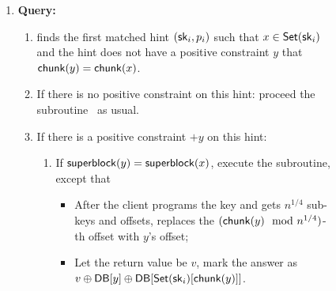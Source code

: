 \begin{figure}[p]
\begin{minipage}{\textwidth}
\begin{mdframed}
\begin{itemize}[leftmargin=3mm,itemsep=1pt]
                             
            \end{itemize}
            
            
            
            
            \begin{enumerate}[leftmargin=5mm,itemsep=1pt]
                \item 
                {\bf Query:}
                \begin{enumerate}[leftmargin=5mm,itemsep=1pt]
                    \item 
                    \Client finds {the first} matched hint $(\mathsf{sk}_i, p_i)$
                    such that $x\in \mathsf{Set}(\mathsf{sk}_i)$ and the hint does not have a
                    positive constraint $y$ that $\mathsf{chunk}(y)=\mathsf{chunk}(x)$.
                    

                        \item If there is no positive constraint on this hint:
                        proceed the subroutine~ as usual. 
                        
                        \item  If there is a positive constraint $+y$ on this
                        hint: 
                        \begin{enumerate}
                            \item If $\mathsf{superblock}(y)=\mathsf{superblock}(x)$, 
                            execute the subroutine, except that
                            \begin{itemize}
                                \item After the client programs the key and gets $n^{1/4}$ sub-keys and offsets, replaces the $(\mathsf{chunk}(y) \mod
                                n^{1/4})$-th offset with $y$'s offset; 
                                \item Let the return value be $v$, mark the
                                answer as $v\oplus\mathsf{DB}[y]\oplus
                                \mathsf{DB}[\mathsf{Set}(\mathsf{sk}_i)[\mathsf{chunk}(y)]]$. 
                            \end{itemize}


\end{enumerate}
\end{enumerate}
\end{enumerate}
\end{mdframed}
\end{minipage}
\end{figure}
